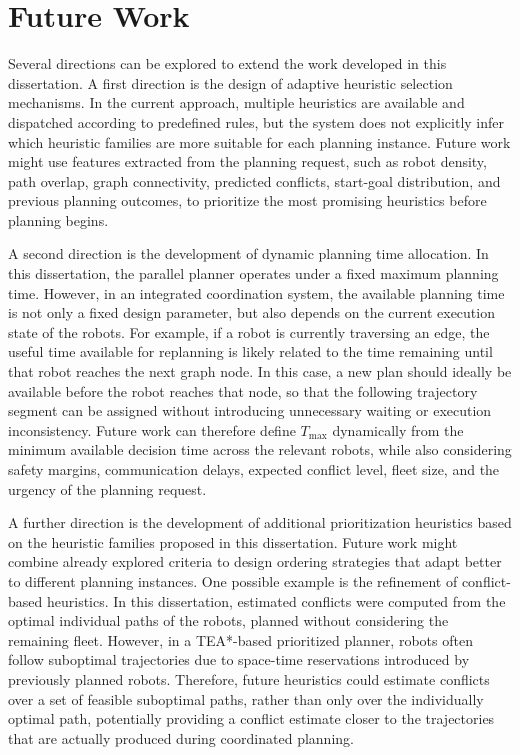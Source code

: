 \section{Future Work}
\hspace{\parindent}
Several directions can be explored to extend the work developed in this dissertation. A first direction is the design of adaptive heuristic selection mechanisms. In the current approach, multiple heuristics are available and dispatched according to predefined rules, but the system does not explicitly infer which heuristic families are more suitable for each planning instance. Future work might use features extracted from the planning request, such as robot density, path overlap, graph connectivity, predicted conflicts, start-goal distribution, and previous planning outcomes, to prioritize the most promising heuristics before planning begins.

A second direction is the development of dynamic planning time allocation. In this dissertation, the parallel planner operates under a fixed maximum planning time. However, in an integrated coordination system, the available planning time is not only a fixed design parameter, but also depends on the current execution state of the robots. For example, if a robot is currently traversing an edge, the useful time available for replanning is likely related to the time remaining until that robot reaches the next graph node. In this case, a new plan should ideally be available before the robot reaches that node, so that the following trajectory segment can be assigned without introducing unnecessary waiting or execution inconsistency. Future work can therefore define \(T_{\max}\) dynamically from the minimum available decision time across the relevant robots, while also considering safety margins, communication delays, expected conflict level, fleet size, and the urgency of the planning request.

A further direction is the development of additional prioritization heuristics based on the heuristic families proposed in this dissertation. Future work might combine already explored criteria to design ordering strategies that adapt better to different planning instances. One possible example is the refinement of conflict-based heuristics. In this dissertation, estimated conflicts were computed from the optimal individual paths of the robots, planned without considering the remaining fleet. However, in a TEA*-based prioritized planner, robots often follow suboptimal trajectories due to space-time reservations introduced by previously planned robots. Therefore, future heuristics could estimate conflicts over a set of feasible suboptimal paths, rather than only over the individually optimal path, potentially providing a conflict estimate closer to the trajectories that are actually produced during coordinated planning.

